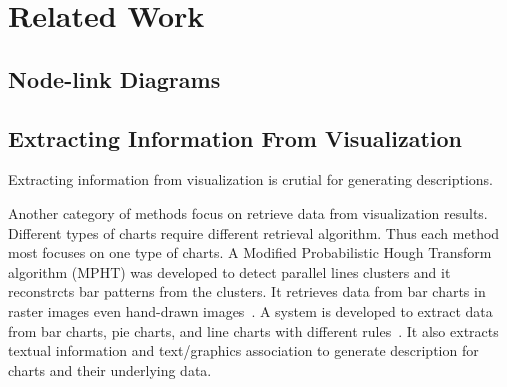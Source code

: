 \section{Related Work}\label{sec:relatedwork}
\subsection{Node-link Diagrams}
\subsection{Extracting Information From Visualization}
Extracting information from visualization is crutial for generating descriptions.

Another category of methods focus on retrieve data from visualization results.
Different types of charts require different retrieval algorithm.
Thus each method most focuses on one type of charts.
A Modified Probabilistic Hough Transform algorithm (MPHT) was developed to detect parallel lines clusters and it reconstrcts bar patterns from the clusters. It retrieves data from bar charts in raster images even hand-drawn images~\cite{DBLP:conf/icip/ZhouT00}. 
A system is developed to extract data from bar charts, pie charts, and line charts with different rules~\cite{DBLP:conf/doceng/HuangT07}. It also extracts textual information and text/graphics association to generate description for charts and their underlying data.





% 

